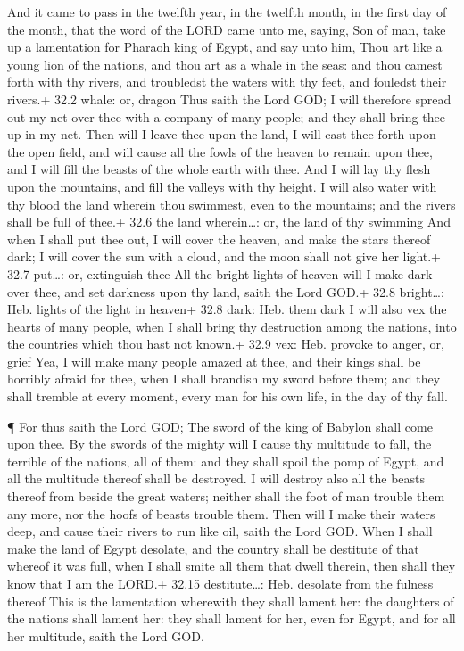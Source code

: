  And it came to pass in the twelfth year, in the twelfth
month, in the first day of the month, that the word of the LORD came
unto me, saying,  Son of man, take up a lamentation for
Pharaoh king of Egypt, and say unto him, Thou art like a young lion of
the nations, and thou art as a whale in the seas: and thou camest forth
with thy rivers, and troubledst the waters with thy feet, and fouledst
their rivers.+ 32.2 whale: or, dragon  Thus saith the Lord
GOD; I will therefore spread out my net over thee with a company of many
people; and they shall bring thee up in my net.  Then will I
leave thee upon the land, I will cast thee forth upon the open field,
and will cause all the fowls of the heaven to remain upon thee, and I
will fill the beasts of the whole earth with thee.  And I
will lay thy flesh upon the mountains, and fill the valleys with thy
height.  I will also water with thy blood the land wherein
thou swimmest, even to the mountains; and the rivers shall be full of
thee.+ 32.6 the land wherein\ldots: or, the land of thy swimming
 And when I shall put thee out, I will cover the heaven, and
make the stars thereof dark; I will cover the sun with a cloud, and the
moon shall not give her light.+ 32.7 put\ldots: or, extinguish thee
 All the bright lights of heaven will I make dark over thee,
and set darkness upon thy land, saith the Lord GOD.+ 32.8 bright\ldots:
Heb. lights of the light in heaven+ 32.8 dark: Heb. them dark
 I will also vex the hearts of many people, when I shall
bring thy destruction among the nations, into the countries which thou
hast not known.+ 32.9 vex: Heb. provoke to anger, or, grief
 Yea, I will make many people amazed at thee, and their
kings shall be horribly afraid for thee, when I shall brandish my sword
before them; and they shall tremble at every moment, every man for his
own life, in the day of thy fall.

 ¶ For thus saith the Lord GOD; The sword of the king of
Babylon shall come upon thee.  By the swords of the mighty
will I cause thy multitude to fall, the terrible of the nations, all of
them: and they shall spoil the pomp of Egypt, and all the multitude
thereof shall be destroyed.  I will destroy also all the
beasts thereof from beside the great waters; neither shall the foot of
man trouble them any more, nor the hoofs of beasts trouble them.
 Then will I make their waters deep, and cause their rivers
to run like oil, saith the Lord GOD.  When I shall make the
land of Egypt desolate, and the country shall be destitute of that
whereof it was full, when I shall smite all them that dwell therein,
then shall they know that I am the LORD.+ 32.15 destitute\ldots: Heb.
desolate from the fulness thereof  This is the lamentation
wherewith they shall lament her: the daughters of the nations shall
lament her: they shall lament for her, even for Egypt, and for all her
multitude, saith the Lord GOD.

